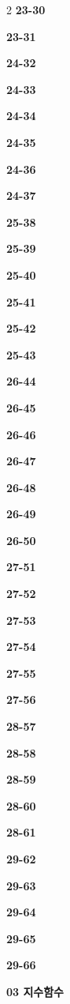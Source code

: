 \documentclass[10pt,a4paper]{article}
\begin{document}
\begin{multicols}{2}
\noindent\textbf{23-30}\ \par
\noindent\textbf{23-31}\ \par
\noindent\textbf{24-32}\ \par
\noindent\textbf{24-33}\ \par
\noindent\textbf{24-34}\ \par
\noindent\textbf{24-35}\ \par
\noindent\textbf{24-36}\ \par
\noindent\textbf{24-37}\ \par
\noindent\textbf{25-38}\ \par
\noindent\textbf{25-39}\ \par
\noindent\textbf{25-40}\ \par
\noindent\textbf{25-41}\ \par
\noindent\textbf{25-42}\ \par
\noindent\textbf{25-43}\ \par
\noindent\textbf{26-44}\ \par
\noindent\textbf{26-45}\ \par
\noindent\textbf{26-46}\ \par
\noindent\textbf{26-47}\ \par
\noindent\textbf{26-48}\ \par
\noindent\textbf{26-49}\ \par
\noindent\textbf{26-50}\ \par
\noindent\textbf{27-51}\ \par
\noindent\textbf{27-52}\ \par
\noindent\textbf{27-53}\ \par
\noindent\textbf{27-54}\ \par
\noindent\textbf{27-55}\ \par
\noindent\textbf{27-56}\ \par
\noindent\textbf{28-57}\ \par
\noindent\textbf{28-58}\ \par
\noindent\textbf{28-59}\ \par
\noindent\textbf{28-60}\ \par
\noindent\textbf{28-61}\ \par
\noindent\textbf{29-62}\ \par
\noindent\textbf{29-63}\ \par
\noindent\textbf{29-64}\ \par
\noindent\textbf{29-65}\ \par
\noindent\textbf{29-66}\ \par
\noindent\textbf{03 지수함수}\par\smallskip

\end{multicols}
\end{document}
